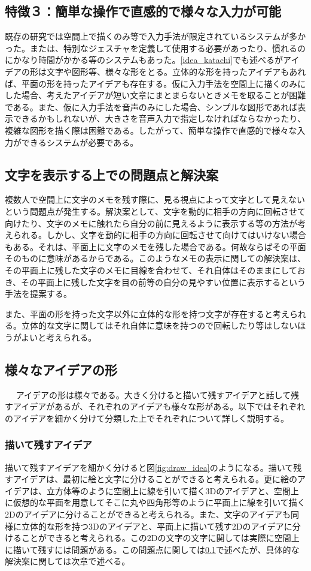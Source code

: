 \documentclass[11pt,a4j, titlepage]{jarticle} %
\begin{document}
\subsection*{特徴３：簡単な操作で直感的で様々な入力が可能}
既存の研究では空間上で描くのみ等で入力手法が限定されているシステムが多かった。または、特別なジェスチャを定義して使用する必要があったり、慣れるのにかなり時間がかかる等のシステムもあった。\ref{idea_katachi}でも述べるがアイデアの形は文字や図形等、様々な形をとる。立体的な形を持ったアイデアもあれば、平面の形を持ったアイデアも存在する。仮に入力手法を空間上に描くのみにした場合、考えたアイデアが短い文章にまとまらないときメモを取ることが困難である。また、仮に入力手法を音声のみにした場合、シンプルな図形であれば表示できるかもしれないが、大きさを音声入力で指定しなければならなかったり、複雑な図形を描く際は困難である。したがって、簡単な操作で直感的で様々な入力ができるシステムが必要である。

\subsection{文字を表示する上での問題点と解決案} \label{moji_mondai}
複数人で空間上に文字のメモを残す際に、見る視点によって文字として見えないという問題点が発生する。解決案として、文字を動的に相手の方向に回転させて向けたり、文字のメモに触れたら自分の前に見えるように表示する等の方法が考えられる。しかし、文字を動的に相手の方向に回転させて向けてはいけない場合もある。それは、平面上に文字のメモを残した場合である。何故ならばその平面そのものに意味があるからである。このようなメモの表示に関しての解決案は、その平面上に残した文字のメモに目線を合わせて、それ自体はそのままにしておき、その平面上に残した文字を目の前等の自分の見やすい位置に表示するという手法を提案する。

また、平面の形を持った文字以外に立体的な形を持つ文字が存在すると考えられる。立体的な文字に関してはそれ自体に意味を持つので回転したり等はしないほうがよいと考えられる。

\subsection{様々なアイデアの形}　\label{idea_katachi}
アイデアの形は様々である。大きく分けると描いて残すアイデアと話して残すアイデアがあるが、それぞれのアイデアも様々な形がある。以下ではそれぞれのアイデアを細かく分けて分類した上でそれぞれについて詳しく説明する。

\subsubsection{描いて残すアイデア} \label{draw_idea}
描いて残すアイデアを細かく分けると図\ref{fig:draw_idea}のようになる。描いて残すアイデアは、最初に絵と文字に分けることができると考えられる。更に絵のアイデアは、立方体等のように空間上に線を引いて描く3Dのアイデアと、空間上に仮想的な平面を用意してそこに丸や四角形等のように平面上に線を引いて描く2Dのアイデアに分けることができると考えられる。また、文字のアイデアも同様に立体的な形を持つ3Dのアイデアと、平面上に描いて残す2Dのアイデアに分けることができると考えられる。この2Dの文字の文字に関しては実際に空間上に描いて残すには問題がある。この問題点に関しては\ref{moji_mondai}で述べたが、具体的な解決案に関しては次章で述べる。
\end{document}
